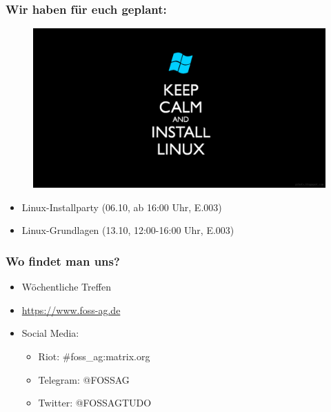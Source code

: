 \begin{frame}
	\frametitle{Wir haben für euch geplant:}
	\begin{figure}
		\includegraphics[scale=0.15]{resources/linuxcalm.png}
	\end{figure}
	\begin{itemize}
		\item Linux-Installparty (06.10, ab 16:00 Uhr, E.003)
		\item Linux-Grundlagen (13.10, 12:00-16:00 Uhr, E.003)
	\end{itemize}
\end{frame}

\begin{frame}
	\frametitle{Wo findet man uns?}
	\begin{itemize}
		\item Wöchentliche Treffen
		\item \url{https://www.foss-ag.de}
		\item Social Media:
		\begin{itemize}
			\item Riot: \#foss\_ag:matrix.org
			\item Telegram: @FOSSAG
			\item Twitter: @FOSSAGTUDO
		\end{itemize}
	\end{itemize}
\end{frame}
